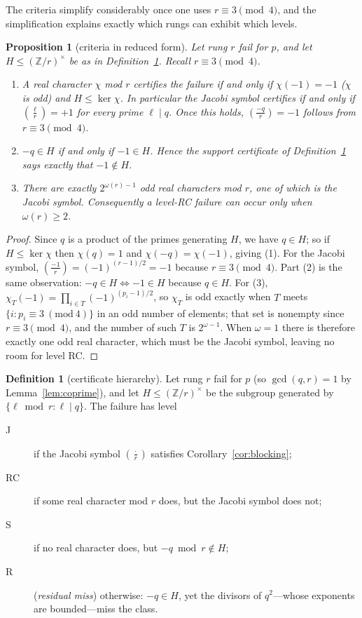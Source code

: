 \documentclass[11pt]{article}
\newtheorem{proposition}[theorem]{Proposition}
\theoremstyle{definition}
\newtheorem{definition}[theorem]{Definition}
\theoremstyle{remark}
\newcommand{\jac}[2]{\left(\tfrac{#1}{#2}\right)}
\begin{document}
The criteria simplify considerably once one uses $r \equiv 3 \pmod 4$, and the
simplification explains exactly which rungs can exhibit which levels.

\begin{proposition}[criteria in reduced form]\label{prop:reduced}
Let rung $r$ fail for $p$, and let $H \le (\mathbb{Z}/r)^\times$ be as in
Definition~\ref{def:hierarchy}. Recall $r \equiv 3 \pmod 4$.
\begin{enumerate}
\item A real character $\chi$ mod $r$ certifies the failure if and only if
$\chi(-1) = -1$ \textup{(}$\chi$ is odd\textup{)} and $H \le \ker\chi$. In
particular the Jacobi symbol certifies if and only if $\jac{\ell}{r} = +1$ for every
prime $\ell \mid q$. Once this holds, $\jac{-q}{r}=-1$ follows from
$r\equiv3\pmod4$.
\item $-q \in H$ if and only if $-1 \in H$. Hence the support certificate of
Definition~\ref{def:hierarchy} says exactly that $-1 \notin H$.
\item There are exactly $2^{\omega(r)-1}$ odd real characters mod $r$, one of which is
the Jacobi symbol. Consequently a level-\textup{RC} failure can occur only when
$\omega(r) \ge 2$.
\end{enumerate}
\end{proposition}

\begin{proof}
Since $q$ is a product of the primes generating $H$, we have $q \in H$; so if
$H \le \ker\chi$ then $\chi(q) = 1$ and $\chi(-q) = \chi(-1)$, giving (1). For the
Jacobi symbol, $\jac{-1}{r} = (-1)^{(r-1)/2} = -1$ because $r \equiv 3 \pmod 4$.
Part (2) is the same observation: $-q \in H \iff -1 \in H$ because $q \in H$. For (3),
$\chi_T(-1) = \prod_{i \in T}(-1)^{(p_i-1)/2}$, so $\chi_T$ is odd exactly when $T$
meets $\{i : p_i \equiv 3 \ (\mathrm{mod}\ 4)\}$ in an odd number of elements; that
set is nonempty since $r \equiv 3 \pmod 4$, and the number of such $T$ is
$2^{\omega-1}$. When $\omega = 1$ there is therefore exactly one odd real character,
which must be the Jacobi symbol, leaving no room for level \textup{RC}.
\end{proof}

\begin{definition}[certificate hierarchy]\label{def:hierarchy}
Let rung $r$ fail for $p$ (so $\gcd(q,r) = 1$ by Lemma~\ref{lem:coprime}), and let
$H \le (\mathbb{Z}/r)^\times$ be the subgroup generated by
$\{\ell \bmod r : \ell \mid q\}$. The failure has level
\begin{description}
\item[J] if the Jacobi symbol $\jac{\cdot}{r}$ satisfies Corollary~\ref{cor:blocking};
\item[RC] if some real character mod $r$ does, but the Jacobi symbol does not;
\item[S] if no real character does, but $-q \bmod r \notin H$;
\item[R] (\emph{residual miss}) otherwise: $-q \in H$, yet the divisors of $q^2$---whose
exponents are bounded---miss the class.
\end{description}
\end{definition}
\end{document}
